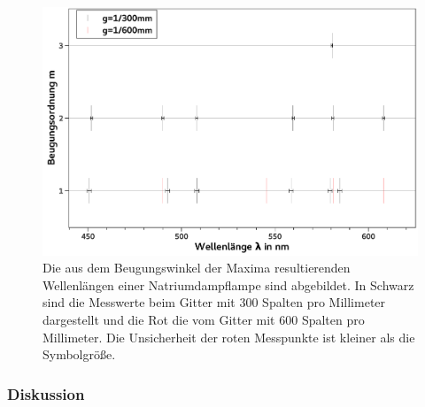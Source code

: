 \documentclass[
	a4paper,
	12pt,
	pagesize,
	ngerman
]{scrartcl}
\begin{document}
	\begin{figure}[H] %
		\includegraphics[width=1\textwidth]{fig_natrium}  %
		\centering
		\caption{Die aus dem Beugungswinkel der Maxima resultierenden Wellenlängen einer Natriumdampflampe sind abgebildet.
		In Schwarz sind die Messwerte beim Gitter mit 300 Spalten pro Millimeter dargestellt und die Rot die vom Gitter mit 600 Spalten pro Millimeter.
		Die Unsicherheit der roten Messpunkte ist kleiner als die Symbolgröße.}
		\label{fig_natrium}
		\centering
	\end{figure}

	\subsubsection{Diskussion}
	
\end{document}

